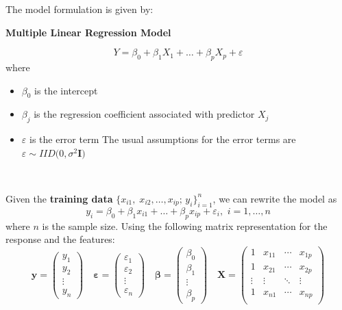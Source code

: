 \documentclass[
]{book}
\begin{document}
The model formulation is given by:
~

\textbf{Multiple Linear Regression Model}

\[ Y = \beta_0 + \beta_1 X_1 + \ldots + \beta_p X_p + \varepsilon \]
where

\begin{itemize}
\item
  \(\beta_0\) is the intercept
\item
  \(\beta_j\) is the regression coefficient associated with predictor \(X_j\)
\item
  \(\varepsilon\) is the error term
  The usual assumptions for the error terms are \(\varepsilon \sim IID \bigl(0, \sigma^2 \mathbf{I} \bigr)\)
\end{itemize}

~

Given the \textbf{training data} \(\bigl\{ x_{i1},\; x_{i2}, \ldots, x_{ip};\, y_i\bigr\}_{i=1}^{n}\), we can rewrite the model as
\[ y_i = \beta_0 + \beta_1 x_{i1} + \ldots + \beta_p x_{ip} + \varepsilon_i,\,\, i=1, \ldots, n\]
where \(n\) is the sample size. Using the following matrix representation for the response and the features:
\[
    \mathbf{y}=\left(\begin{array}{c} 
      y_{1} \\ y_{2} \\ \vdots \\ y_{n}
    \end{array}\right)
    \quad
    \mathbf{\varepsilon}=\left(\begin{array}{c} 
      \varepsilon_{1} \\ \varepsilon_{2} \\ \vdots \\ \varepsilon_{n}
    \end{array}\right)
    \quad
    \mathbf{\beta}=\left(\begin{array}{c} 
      \beta_{0} \\ \beta_{1} \\ \vdots \\ \beta_p
    \end{array}\right)\quad
    \mathbf{X}=\left(\begin{array}{cccc}
    1 & x_{11} & \cdots & x_{1p} \\
    1 & x_{21} & \cdots & x_{2p}   \\
      \vdots & \vdots & \ddots & \vdots\\
   1 & x_{n1} & \cdots & x_{np}  \\
    \end{array} \right)
  \]
\end{document}
